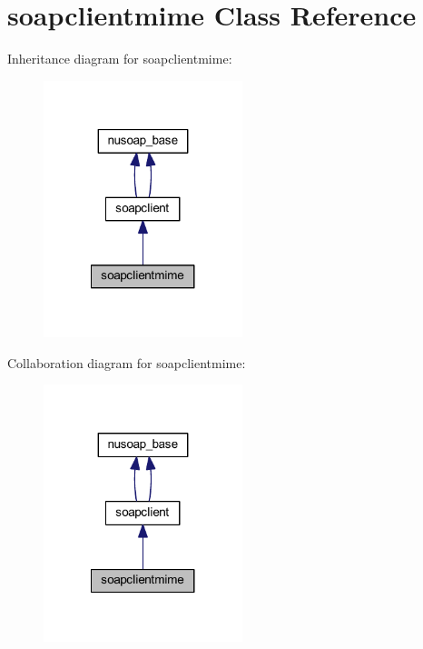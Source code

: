 \hypertarget{classsoapclientmime}{\section{soapclientmime Class Reference}
\label{classsoapclientmime}
}


Inheritance diagram for soapclientmime\-:
\nopagebreak
\begin{figure}[H]
\begin{center}
\leavevmode
\includegraphics[width=164pt]{classsoapclientmime__inherit__graph}
\end{center}
\end{figure}


Collaboration diagram for soapclientmime\-:
\nopagebreak
\begin{figure}[H]
\begin{center}
\leavevmode
\includegraphics[width=164pt]{classsoapclientmime__coll__graph}
\end{center}
\end{figure}
